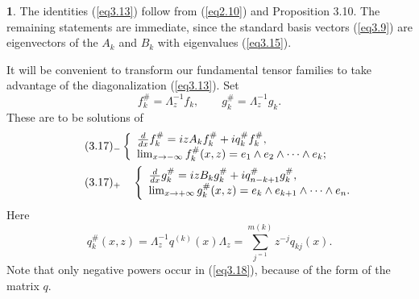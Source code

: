 \documentclass{surv-l}
\theoremstyle{plain}
\theoremstyle{definition}
\newtheorem*{pf}{\sc{Proof}}
\numberwithin{equation}{chapter}
\begin{document}
\begin{pf}
The identities (\ref{eq3.13}) follow from (\ref{eq2.10}) and Proposition 3.10. The remaining statements are immediate, since the standard basis vectors (\ref{eq3.9}) are eigenvectors of the $A_{k}$ and $B_{k}$ with eigenvalues (\ref{eq3.15}).
\end{pf}
It will be convenient to transform our fundamental tensor families to take advantage of the diagonalization (\ref{eq3.13}). Set
\begin{equation}\label{eq3.16}
f_{k}^{\#}=\Lambda_{z}^{-1}f_{k},\qquad g_{k}^{\#}=\Lambda_{z}^{-1}g_{k}.
\end{equation}
These are to be solutions of
\begin{align*}\label{eq3.17-}
&\tag*{$(3.17)_{-}$} \left\{\begin{array}{ll}
\frac{d}{dx}f_{k}^{\#}=izA_{k}f_{k}^{\#}+iq_{k}^{\#}f_{k}^{\#},\\\notag
\lim_{x\rightarrow-\infty}f_{k}^{\#}(x, z)=e_{1}\wedge e_{2}\wedge\cdots \wedge e_{k};
\end{array}\right.\\ \notag
&\tag*{$(3.17)_{+}$}  \quad \left\{\begin{array}{ll}
\frac{d}{dx}g_{k}^{\#}=izB_{k}g_{k}^{\#}+iq_{n-k+1}^{\#}g_{k}^{\#},\\ \notag
\lim_{x\rightarrow+\infty}g_{k}^{\#} (x, z)=e_{k}\wedge e_{k+1}\wedge\cdots\wedge e_{n}.
\end{array}\right.\\
\end{align*}
Here
\setcounter{equation}{17}
\begin{equation}\label{eq3.18}
q_{k}^{\#}(x, z)=\Lambda_{z}^{-1}q^{(k)}(x)\Lambda_{z}=\sum_{j^{=1}}^{m(k)}z^{-j}q_{kj}(x).
\end{equation}
Note that only negative powers occur in (\ref{eq3.18}), because of the form of the matrix $q$.
\end{document}
